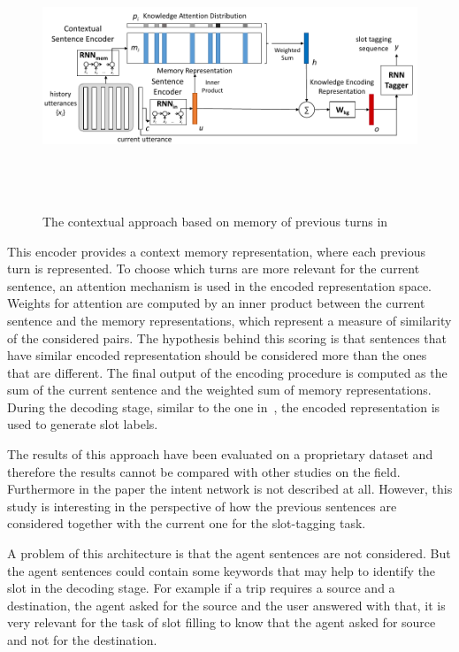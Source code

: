 \begin{figure}[!htbp]
    \centering
    \includegraphics[max width=\linewidth,max height=8cm,keepaspectratio]{figures/contextualSLUchen}
    \caption{The contextual approach based on memory of previous turns in~\cite{chen2016end}}\label{fig:contextualSLUchen}
\end{figure}

This encoder provides a context memory representation, where each previous turn is represented. To choose which turns are more relevant for the current sentence, an attention mechanism is used in the encoded representation space. Weights for attention are computed by an inner product between the current sentence and the memory representations, which represent a measure of similarity of the considered pairs. The hypothesis behind this scoring is that sentences that have similar encoded representation should be considered more than the ones that are different. The final output of the encoding procedure is computed as the sum of the current sentence and the weighted sum of memory representations. During the decoding stage, similar to the one in~\cite{cho2014learning}, the encoded representation is used to generate slot labels.

The results of this approach have been evaluated on a proprietary dataset and therefore the results cannot be compared with other studies on the field. Furthermore in the paper the intent network is not described at all. However, this study is interesting in the perspective of how the previous sentences are considered together with the current one for the slot-tagging task.

A problem of this architecture is that the agent sentences are not considered. But the agent sentences could contain some keywords that may help to identify the slot in the decoding stage. For example if a trip requires a source and a destination, the agent asked for the source and the user answered with that, it is very relevant for the task of slot filling to know that the agent asked for source and not for the destination.

